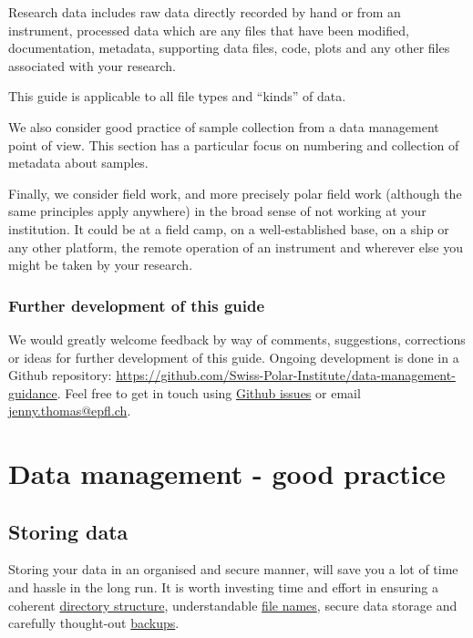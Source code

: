 \documentclass[12pt,a4paper,oneside]{report}
\begin{document}
Research data includes raw data directly recorded by hand or from an
instrument, processed data which are any files that have been modified,
documentation, metadata, supporting data files, code, plots and any
other files associated with your research.

This guide is applicable to all file types and ``kinds'' of data.

We also consider good practice of sample collection from a data
management point of view. This section has a particular focus on
numbering and collection of metadata about samples.

Finally, we consider field work, and more precisely polar field work
(although the same principles apply anywhere) in the broad sense of not
working at your institution. It could be at a field camp, on a
well-established base, on a ship or any other platform, the remote
operation of an instrument and wherever else you might be taken by your
research.

\hypertarget{further-development-of-this-guide}{%
\section{Further development of this
guide}\label{further-development-of-this-guide}}

We would greatly welcome feedback by way of comments, suggestions,
corrections or ideas for further development of this guide. Ongoing
development is done in a Github repository:
\url{https://github.com/Swiss-Polar-Institute/data-management-guidance}.
Feel free to get in touch using
\href{https://github.com/Swiss-Polar-Institute/data-management-guidance/issues}{Github
issues} or email \url{jenny.thomas@epfl.ch}.

\hypertarget{data-management---good-practice}{%
\part{Data management - good
practice}\label{data-management---good-practice}}

\hypertarget{storing-data}{%
\chapter{Storing data}\label{storing-data}}

Storing your data in an organised and secure manner, will save you a lot
of time and hassle in the long run. It is worth investing time and
effort in ensuring a coherent
\protect\hyperlink{directory-structure}{directory structure},
understandable \protect\hyperlink{file-naming}{file names}, secure data
storage and carefully thought-out
\protect\hyperlink{data-backup}{backups}.
\end{document}
